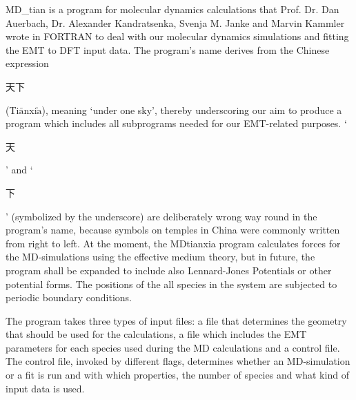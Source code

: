 \documentclass[twoside, 11pt, titlepage, captions=nooneline, a4paper, headsepline]{scrbook}%
\begin{document}
MD\_tian is a program for molecular dynamics calculations that Prof. Dr. Dan Auerbach, Dr. Alexander Kandratsenka, Svenja M. Janke and Marvin Kammler wrote in FORTRAN to deal with our molecular dynamics simulations and fitting the EMT to DFT input data. The program's name derives from the Chinese expression
\begin{CJK*}{UTF8}{gbsn}
天下
\end{CJK*}
(Ti$\bar{\mathrm{a}}$nxi$\grave{\mathrm{a}}$), meaning `under one sky', thereby underscoring our aim to produce a program which includes all subprograms needed for our EMT-related purposes. `\begin{CJK*}{UTF8}{gbsn}
天
\end{CJK*}' and `\begin{CJK*}{UTF8}{gbsn}
下
\end{CJK*}' (symbolized by the underscore) are deliberately wrong way round in the program's name, because symbols on temples in China were commonly written from right to left.
At the moment, the MDtianxia program calculates forces for the MD-simulations using the effective medium theory, but in future, the program shall be expanded to include also Lennard-Jones Potentials or other potential forms. 
The positions of the all species in the system are subjected to periodic boundary conditions.

The program takes three types of input files: a file that determines the geometry that should be used for the calculations, a file which includes the EMT parameters for each species used during the MD calculations and a control file. The control file, invoked by different flags, determines whether an MD-simulation or a fit is run and with which properties, the number of species and what kind of input data is used.
\end{document}
